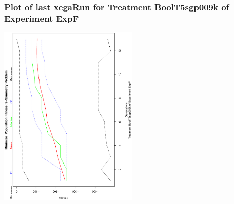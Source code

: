  \begin{frame}
 \frametitle{ Plot of last xegaRun for Treatment BoolT5sgp009k of Experiment ExpF }
 \begin{center}
\includegraphics[width=0.5\textwidth, angle=-90]
{ExpFPlotPopStatsFigure007.eps}
 \end{center}
 \label{templateReport/ExpFPlotPopStatsFigure007.eps}  
 \end{frame}

